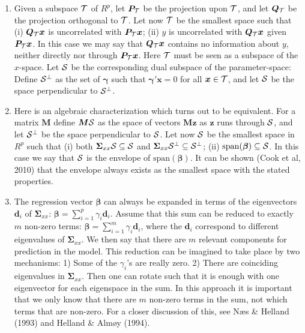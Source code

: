 \documentclass[a4paper, 11pt]{article}
\begin{document}
\begin{enumerate}[label=\Alph*.]

\item Given a subspace $\cal{T}$ of $R^p$, let $\bm{P}_{\cal{T}}$ be the projection upon $\cal{T}$, and let $\bm{Q}_{\cal{T}}$ be the projection orthogonal to $\cal{T}$. Let now $\cal{T}$ be the smallest space such that (i) $\bm{Q}_{\cal{T}}\bm{x}$ is uncorrelated with $\bm{P}_{\cal{T}}\bm{x}$; (ii) $y$ is uncorrelated with $\bm{Q}_{\cal{T}}\bm{x}$ given $\bm{P}_{\cal{T}}\bm{x}$. In this case we may say that $\bm{Q}_{\cal{T}}\bm{x}$ contains no information about $y$, neither directly nor through $\bm{P}_{\cal{T}}\bm{x}$. Here $\cal{T}$ must be seen as a subspace of the $x$-space. Let $\cal{S}$ be the corresponding dual subspace of the parameter-space: Define $\cal{S}^\perp$ as the set of $\bm{\gamma}$ such that $\bm{\gamma}'\bm{x}=0$ for all $\bm{x}\in\cal{T}$, and let $\cal{S}$ be the space perpendicular to $\cal{S}^\perp$.
  \smallskip

\item  Here is an algebraic characterization which turns out to be equivalent. For a matrix $\bm{M}$ define $\bm{M}\cal{S}$ as the space of vectors $\bm{Mz}$ as $\bm{z}$ runs through $\cal{S}$, and let $\cal{S}^\perp$ be
  the space perpendicular to $\cal{S}$. Let now $\cal{S}$ be the smallest space in $R^p$ such that (i) both $\bm{\Sigma}_{xx}\cal{S}\subseteq\cal{S}$ and
  $\bm{\Sigma}_{xx}\cal{S}^\perp\subseteq\cal{S}^\perp$; (ii) $\mathrm{span}(\bm{\beta})\subseteq\cal{S}$. In this case we say that $\cal{S}$
  is the envelope of $\mathrm{span}(\bm{\beta})$. It can be shown (Cook et al, 2010) that the envelope always exists as the smallest space with the stated properties.
  \smallskip

\item The regression vector $\bm{\beta}$ can always be expanded in terms of the eigenvectors $\bm{d}_{i}$ of $\bm{\Sigma}_{xx}$:
  $\bm{\beta}=\sum_{i=1}^p \gamma_{i}\bm{d}_{i}$. Assume that this sum can be reduced to exactly $m$ non-zero terms:
  $\bm{\beta}=\sum_{i=1}^m \gamma_{i}\bm{d}_{i}$, where the $\bm{d}_i$ correspond to different eigenvalues of $\bm{\Sigma}_{xx}$. We then say that there are $m$ relevant components for prediction in the model. This reduction can be imagined to take place by two mechanisms: 1) Some of the $\gamma_i$'s are really zero. 2) There are coinciding eigenvalues in $\bm{\Sigma}_{xx}$. Then one can rotate such that it is enough with one eigenvector for each eigenspace in the sum. In this approach it is important that we only know that there are $m$ non-zero terms in the sum, not which  terms that are non-zero. For a closer discussion of this, see N\ae s \& Helland (1993) and Helland \& Alm\o y (1994).
  \smallskip


\end{enumerate}
\end{document}
